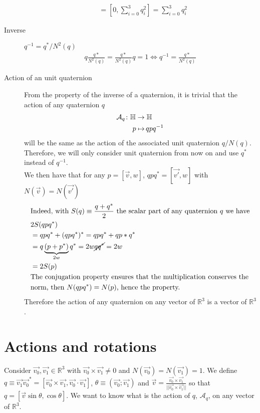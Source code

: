 \documentclass[class=report, float=false, crop=false]{standalone}
\begin{document}
\begin{description}
\begin{align*}
&= [0,\sum_{i=0}^{3} q_i^2] = \sum_{i=0}^{3} q_i^2
\end{align*}
\item[Inverse] $\boxed{q^{-1} = q^*/N^2(q)}$
\begin{align*}
q\frac{q*}{N^2(q)} = \frac{q*}{N^2(q)}q = 1 \Leftrightarrow q^{-1} = \frac{q*}{N^2(q)}
\end{align*}
\item[Action of an unit quaternion] From the property of the inverse of a quaternion, it is trivial that the action of any quaternion $q$
\begin{align*}
\mathcal{A}_q \colon &\mathbb{H} \to \mathbb{H}\\     &\phantomarrow{\mathbb{H}}{p} qpq^{-1}
\end{align*}
will be the same as the action of the associated unit quaternion $q/N(q)$. Therefore, we will only consider unit quaternion from now on and use $q^*$ instead of $q^{-1}$.\\

We then have that for any $p = [\vec{v},w]$, $\boxed{qpq^* = [\vec{v'},w]}$ with $N(\vec{v}) = N(\vec{v'})$
\begin{align*}
&\text{Indeed, with $S(q) \equiv \frac{q+q^*}{2}$ the scalar part of any quaternion $q$ we have}\\
&2S(qpq^*)\\
&= qpq^* + (qpq^*)^* = qpq^* + qp*q^*\\
&= q\underbrace{(p + p^*)}_{2w}q^* = 2w\cancel{qq^*} = 2w\\
&= 2S(p)\\
&\text{The conjugation property ensures that the multiplication conserves the}\\
&\text{norm, then $N(qpq^*)=N(p)$, hence the property.}
\end{align*}
Therefore the action of any quaternion on any vector of $\mathbb{R}^3$ is a vector of $\mathbb{R}^3$.
\end{description}

\section{Actions and rotations}
\label{action_rotation}

Consider $\vec{v_0},\vec{v_1} \in \mathbb{R}^3$ with $\vec{v_0} \times \vec{v_1} \neq 0$ and $N(\vec{v_0}) = N(\vec{v_1}) = 1$. We define $q \equiv \vec{v_1}\vec{v_0}^* = [\vec{v_0}\times\vec{v_1},\vec{v_0}\cdot\vec{v_1}]$, $\theta \equiv (\vec{v_0};\vec{v_1})$ and $\vec{v} = \frac{\vec{v_0} \times \vec{v_1}}{||\vec{v_0} \times \vec{v_1}||}$ so that $q = [\vec{v}\sin\theta,\cos\theta]$. We want to know what is the action of $q$, $\mathcal{A}_q$, on any vector of $\mathbb{R}^3$.\\
\end{document}
